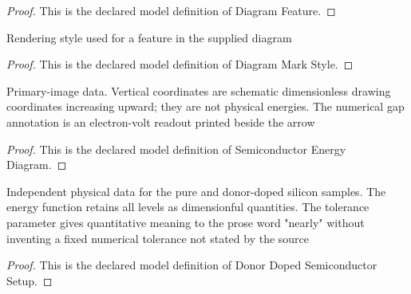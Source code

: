 \begin{proof}
  This is the declared model definition of Diagram Feature.
\end{proof}
\begin{definition}
  \label{def:physics:phyx-mini-0575:phyxminiproblems-problemphyxmini0575-diagrammarkstyle}
  Rendering style used for a feature in the supplied diagram
\end{definition}
\begin{proof}
  This is the declared model definition of Diagram Mark Style.
\end{proof}
\begin{definition}
  \label{def:physics:phyx-mini-0575:phyxminiproblems-problemphyxmini0575-semiconductorenergydiagram}
  Primary-image data. Vertical coordinates are schematic dimensionless drawing coordinates increasing upward; they are not physical energies. The numerical gap annotation is an electron-volt readout printed beside the arrow
\end{definition}
\begin{proof}
  This is the declared model definition of Semiconductor Energy Diagram.
\end{proof}
\begin{definition}
  \label{def:physics:phyx-mini-0575:phyxminiproblems-problemphyxmini0575-donordopedsemiconductorsetup}
  Independent physical data for the pure and donor-doped silicon samples. The energy function retains all levels as dimensionful quantities. The tolerance parameter gives quantitative meaning to the prose word "nearly" without inventing a fixed numerical tolerance not stated by the source
\end{definition}
\begin{proof}
  This is the declared model definition of Donor Doped Semiconductor Setup.
\end{proof}
